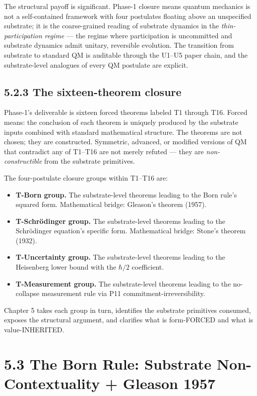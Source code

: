 \documentclass[11pt]{book}
\begin{document}
The structural payoff is significant. Phase-1 closure means quantum mechanics is not a self-contained framework with four postulates floating above an unspecified substrate; it is the coarse-grained reading of substrate dynamics in the \textit{thin-participation regime} — the regime where participation is uncommitted and substrate dynamics admit unitary, reversible evolution. The transition from substrate to standard QM is auditable through the U1–U5 paper chain, and the substrate-level analogues of every QM postulate are explicit.

\subsection{5.2.3 The sixteen-theorem closure}

Phase-1's deliverable is sixteen forced theorems labeled T1 through T16. Forced means: the conclusion of each theorem is uniquely produced by the substrate inputs combined with standard mathematical structure. The theorems are not chosen; they are constructed. Symmetric, advanced, or modified versions of QM that contradict any of T1–T16 are not merely refuted — they are \textit{non-constructible} from the substrate primitives.

The four-postulate closure groups within T1–T16 are:

\begin{itemize}
\item \textbf{T-Born group.} The substrate-level theorems leading to the Born rule's squared form. Mathematical bridge: Gleason's theorem (1957).
\item \textbf{T-Schrödinger group.} The substrate-level theorems leading to the Schrödinger equation's specific form. Mathematical bridge: Stone's theorem (1932).
\item \textbf{T-Uncertainty group.} The substrate-level theorems leading to the Heisenberg lower bound with the $\hbar/2$ coefficient.
\item \textbf{T-Measurement group.} The substrate-level theorems leading to the no-collapse measurement rule via P11 commitment-irreversibility.
\end{itemize}

Chapter 5 takes each group in turn, identifies the substrate primitives consumed, exposes the structural argument, and clarifies what is form-FORCED and what is value-INHERITED.

\section{5.3 The Born Rule: Substrate Non-Contextuality + Gleason 1957}
\end{document}
